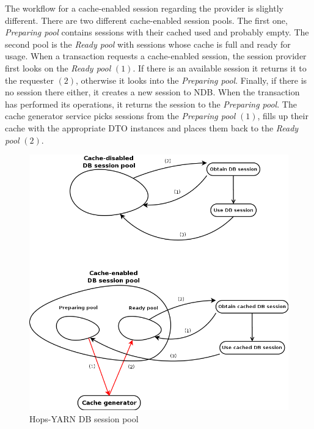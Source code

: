 The workflow for a cache-enabled session regarding the provider is
slightly different. There are two different cache-enabled session
pools. The first one, \emph{Preparing pool} contains sessions with
their cached used and probably empty. The second pool is the
\emph{Ready pool} with sessions whose cache is full and ready for
usage. When a transaction requests a cache-enabled session, the session
provider first looks on the \emph{Ready pool} $(1)$. If there is an
available session it returns it to the requester $(2)$, otherwise it
looks into the \emph{Preparing pool}. Finally, if there is no session
there either, it creates a new session to NDB. When the transaction
has performed its operations, it returns the session to the
\emph{Preparing pool}. The cache generator service picks sessions from
the \emph{Preparing pool} $(1)$, fills up their cache with the appropriate
DTO instances and places them back to the \emph{Ready pool} $(2)$.

\begin{figure}
\centering
\includegraphics[scale=0.4]{resources/images/Implementation/db_session_pools.png}
\caption{Hops-YARN DB session pool}
\label{fig:impl_dto_session_arch}
\end{figure}

